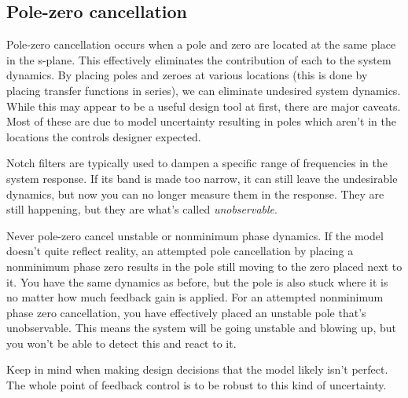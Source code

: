 \subsection{Pole-zero cancellation}
\label{subsec:pole-zero_cancellation}

Pole-zero cancellation occurs when a pole and zero are located at the same place
in the s-plane. This effectively eliminates the contribution of each to the
\gls{system} dynamics. By placing poles and zeroes at various locations (this is
done by placing transfer functions in series), we can eliminate undesired
\gls{system} dynamics. While this may appear to be a useful design tool at
first, there are major caveats. Most of these are due to \gls{model} uncertainty
resulting in poles which aren't in the locations the controls designer expected.

Notch filters are typically used to dampen a specific range of frequencies in
the \gls{system response}. If its band is made too narrow, it can still leave the
undesirable dynamics, but now you can no longer measure them in the response.
They are still happening, but they are what's called \textit{unobservable}.

Never pole-zero cancel unstable or nonminimum phase dynamics. If the \gls{model}
doesn't quite reflect reality, an attempted pole cancellation by placing a
nonminimum phase zero results in the pole still moving to the zero placed next
to it. You have the same dynamics as before, but the pole is also stuck where it
is no matter how much \gls{feedback gain} is applied. For an attempted
nonminimum phase zero cancellation, you have effectively placed an unstable pole
that's unobservable. This means the \gls{system} will be going unstable and
blowing up, but you won't be able to detect this and react to it.

Keep in mind when making design decisions that the \gls{model} likely isn't
perfect. The whole point of feedback control is to be robust to this kind of
uncertainty.
